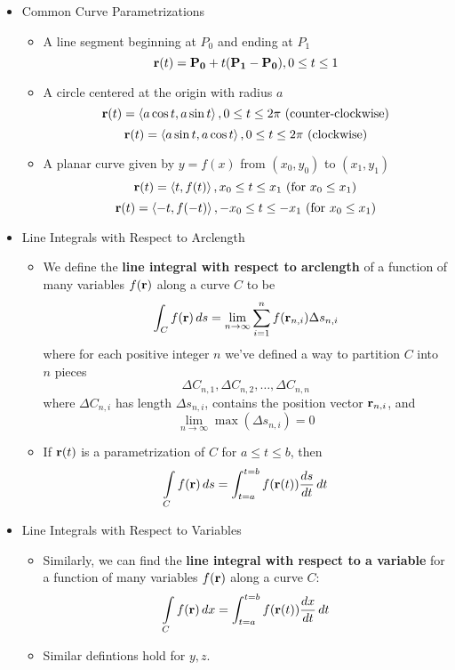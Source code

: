   \begin{itemize}

  \item Common Curve Parametrizations

    \begin{itemize}
      \item A line segment beginning at $P_0$ and ending at $P_1$
        \[
          \mathbf{r}(t) = \mathbf{P_0} + t(\mathbf{P_1}-\mathbf{P_0}), 0\leq t\leq 1
        \]
      \item A circle centered at the origin with radius $a$
        \[
          \mathbf{r}(t) = \left<a\cos t,a\sin t\right>, 0\leq t\leq 2\pi \text{ (counter-clockwise)}
        \]
        \[
          \mathbf{r}(t) = \left<a\sin t,a\cos t\right>, 0\leq t\leq 2\pi \text{ (clockwise)}
        \]
      \item A planar curve given by $y=f(x)$ from $(x_0,y_0)$ to $(x_1,y_1)$
        \[
          \mathbf{r}(t) = \left<t,f(t)\right>, x_0\leq t\leq x_1 \text{ (for } x_0\leq x_1 \text{)}
        \]
        \[
          \mathbf{r}(t) = \left<-t,f(-t)\right>, -x_0\leq t\leq -x_1 \text{ (for } x_0\leq x_1 \text{)}
        \]
    \end{itemize}
  
  \item Line Integrals with Respect to Arclength
  
    \begin{itemize}
    \item We define the \textbf{line integral with respect to arclength} of a function of many variables $f(\mathbf{r})$ along a curve $C$ to be 
      \[
        \int_C f(\mathbf{r})\,d{s} = \lim_{n\to\infty}\sum_{i=1}^n f(\mathbf{r}_{n,i})\Delta s_{n,i}
      \]
    where for each positive integer $n$ we've defined a way to partition $C$ into $n$ pieces 
      \[
        \Delta C_{n,1},\Delta C_{n,2},\dots,\Delta C_{n,n}
      \]
    where $\Delta C_{n,i}$ has length $\Delta s_{n,i}$, contains the position vector $\mathbf{r}_{n,i}$, and \[\lim_{n\to\infty} \max(\Delta s_{n,i}) = 0\]
    \item If $\mathbf{r}(t)$ is a parametrization of $C$ for $a \leq t \leq b$, then 
      \[
        \int\limits_C f(\mathbf{r})\,d{s}=\int_{t=a}^{t=b} f(\mathbf{r}(t))\frac{ds}{dt}\,d{t}
      \]
    \end{itemize}

  \newpage

  \item Line Integrals with Respect to Variables

    \begin{itemize}
    \item Similarly, we can find the \textbf{line integral with respect to a variable} for a function of many variables $f(\mathbf{r})$ along a curve $C$:
      \[
        \int\limits_C f(\mathbf{r})\,d{x}=\int_{t=a}^{t=b} f(\mathbf{r}(t))\frac{dx}{dt}\,d{t}
      \]
    \item Similar defintions hold for $y,z$.
    \end{itemize}


\end{itemize}
